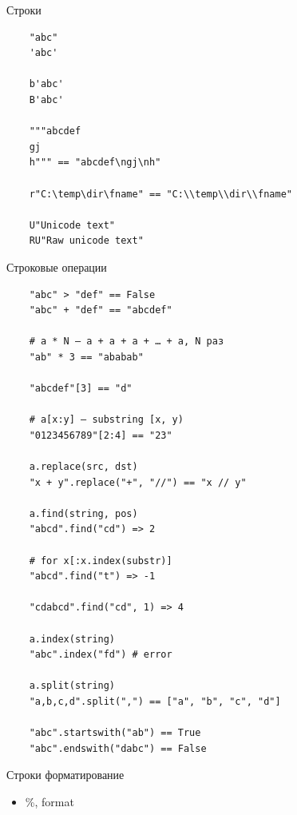 \documentclass{article}
\begin{document}
\begin{center} Строки \end{center}
\vspace{15pt}
\begin{lstlisting}
	"abc"
	'abc'

	b'abc'
	B'abc'

	"""abcdef
	gj
	h""" == "abcdef\ngj\nh"

	r"C:\temp\dir\fname" == "C:\\temp\\dir\\fname"

	U"Unicode text"
	RU"Raw unicode text"
\end{lstlisting}
\newpage

\begin{center} Строковые операции \end{center}
\vspace{15pt}
\begin{lstlisting}
	"abc" > "def" == False
	"abc" + "def" == "abcdef"

	# a * N – a + a + a + … + a, N раз
	"ab" * 3 == "ababab"

	"abcdef"[3] == "d"

	# a[x:y] – substring [x, y)
	"0123456789"[2:4] == "23"

	a.replace(src, dst)
	"x + y".replace("+", "//") == "x // y"

	a.find(string, pos) 
	"abcd".find("cd") => 2
	
	# for x[:x.index(substr)]
	"abcd".find("t") => -1

	"cdabcd".find("cd", 1) => 4

	a.index(string)
	"abc".index("fd") # error

	a.split(string) 
	"a,b,c,d".split(",") == ["a", "b", "c", "d"]

	"abc".startswith("ab") == True
	"abc".endswith("dabc") == False
\end{lstlisting}
\newpage

\begin{center} Строки форматирование \end{center}
\begin{itemize}
	\item \%, format
\end{itemize}
\end{document}
